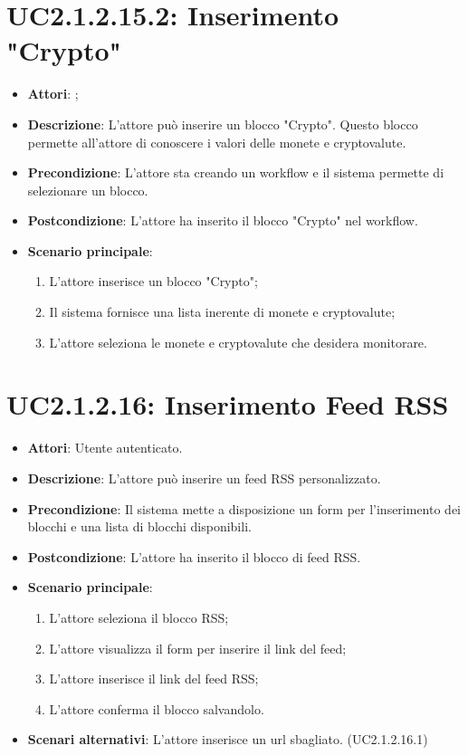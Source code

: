 \section{UC2.1.2.15.2: Inserimento "Crypto"}
\label{UC2.1.2.15.2}
\begin{itemize}
	\item \textbf{Attori}: ;
	\item \textbf{Descrizione}: L'attore può inserire un blocco "Crypto". Questo blocco permette all'attore di conoscere i valori delle monete e cryptovalute.
	\item \textbf{Precondizione}: L'attore sta creando un workflow e il sistema permette di selezionare un blocco.
	\item \textbf{Postcondizione}: L'attore ha inserito il blocco "Crypto" nel workflow.
	\item \textbf{Scenario principale}:
	\begin{enumerate} \item L'attore inserisce un blocco "Crypto";  \item  Il sistema fornisce una lista inerente di monete e cryptovalute;  \item  L'attore seleziona le monete e cryptovalute che desidera monitorare.\end{enumerate}
\end{itemize}

\section{UC2.1.2.16: Inserimento Feed RSS}
\label{UC2.1.2.16}
\begin{itemize}
	\item \textbf{Attori}: Utente autenticato.
	\item \textbf{Descrizione}: L'attore può inserire un feed RSS personalizzato.
	\item \textbf{Precondizione}: Il sistema mette a disposizione un form per l'inserimento dei blocchi e una lista di blocchi disponibili.
	\item \textbf{Postcondizione}: L'attore ha inserito il blocco di feed RSS.
	\item \textbf{Scenario principale}:
	\begin{enumerate} \item L'attore seleziona il blocco RSS; \item L'attore visualizza il form per inserire il link del feed; \item  L'attore inserisce il link del feed RSS; \item L'attore conferma il blocco salvandolo.\end{enumerate}
	\item \textbf{Scenari alternativi}:
	L'attore inserisce un url sbagliato. (UC2.1.2.16.1)
\end{itemize}


